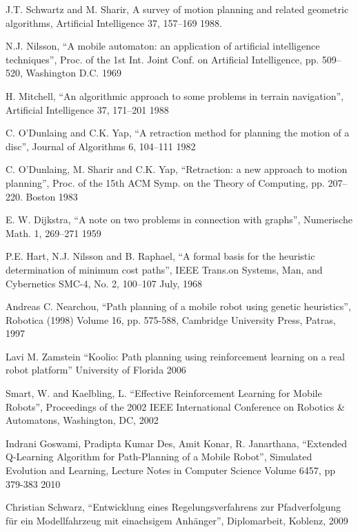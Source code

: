 \documentclass[bsc,en,
oneside,12pt,utf8,a4paper,
]{thesisdifctunl}
\begin{document}
\begin{thebibliography}{9}

  J.T. Schwartz and M. Sharir,
  A survey of motion planning and related geometric algorithms,
  Artificial Intelligence 37, 157–169
  1988.
	
	N.J. Nilsson,
	“A mobile automaton: an application of artificial intelligence techniques”,
	Proc. of the 1st Int. Joint Conf. on Artificial Intelligence, pp. 509–520,
	Washington D.C.
	1969

	H. Mitchell, 
	“An algorithmic approach to some problems in terrain navigation”,
	Artificial Intelligence 37, 171–201
	1988

	C. O’Dunlaing and C.K. Yap,
	“A retraction method for planning the motion of a disc”,
	Journal of Algorithms 6, 104–111 
	1982

	C. O’Dunlaing, M. Sharir and C.K. Yap,
	“Retraction: a new approach to motion planning”,
	Proc. of the 15th ACM Symp. on the Theory of Computing, pp. 207–220.
	Boston
	1983
	
	E. W. Dijkstra,
	“A note on two problems in connection with graphs”,
	Numerische Math. 1, 269–271 
	1959
	
	P.E. Hart, N.J. Nilsson and B. Raphael,
	“A formal basis for the heuristic determination of minimum cost paths”,
	IEEE Trans.on Systems, Man, and Cybernetics SMC-4, No. 2, 100–107
	July, 1968
	
	Andreas C. Nearchou,
	"`Path planning of a mobile robot using genetic heuristics"',
	Robotica (1998) Volume 16, pp. 575-588,
	Cambridge University Press,
	Patras,
	1997	
	
	Lavi M. Zamstein
	"`Koolio: Path planning using reinforcement learning on a real robot platform"'
	University of Florida
	2006
	
	Smart, W. and Kaelbling, L.
	"`Effective Reinforcement Learning for Mobile Robots"',
	Proceedings of the 2002 IEEE International Conference on Robotics & Automatons,
	Washington, DC,
	2002
	
	Indrani Goswami, Pradipta Kumar Des, Amit Konar, R. Janarthana,
	"`Extended Q-Learning Algorithm for Path-Planning of a Mobile Robot"',
	Simulated Evolution and Learning, Lecture Notes in Computer Science Volume 6457, pp 379-383
	2010

	Christian Schwarz,
	"`Entwicklung eines Regelungsverfahrens zur Pfadverfolgung für ein Modellfahrzeug mit einachsigem Anhänger"',
	Diplomarbeit,
	Koblenz,
	2009
	

\end{thebibliography}
\end{document}
